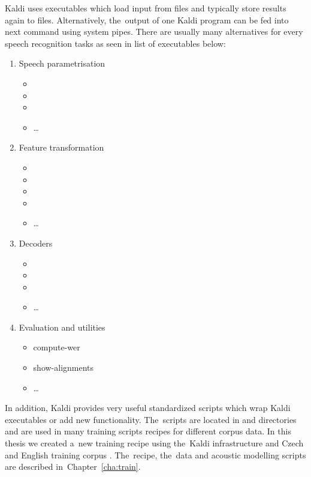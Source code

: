 Kaldi uses executables which load input from files and typically store results again to files.
Alternatively, the~output of one Kaldi program can be fed into next command using system pipes.
There are usually many alternatives for every speech recognition tasks as seen in list of executables below:
\begin{enumerate}
    \item Speech parametrisation
        \begin{itemize}
            \item {}
            \item {}
            \item {}
            \item \ldots
        \end{itemize}
    \item Feature transformation
        \begin{itemize}
            \item {}
            \item {}
            \item {}
            \item {}
            \item \ldots
        \end{itemize}
    \item Decoders
        \begin{itemize}
            \item {}
            \item {}
            \item {}
            \item \ldots
        \end{itemize}
    \item Evaluation and utilities
        \begin{itemize}
            \item compute-wer
            \item show-alignments
            \item \ldots
        \end{itemize}
\end{enumerate}
In addition, Kaldi provides very useful standardized scripts which wrap Kaldi executables or add new functionality. 
The~scripts are located in  and  directories and are used in many training scripts recipes for different corpus data.
In this thesis we created a~new training recipe using the~Kaldi infrastructure and Czech and English training corpus \cite{korvas_2014}.
The~recipe, the~data and acoustic modelling scripts are described in~Chapter~\ref{cha:train}.

